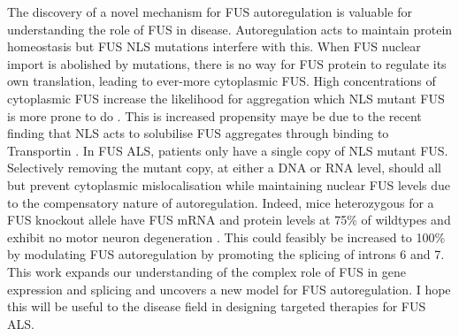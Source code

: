 The discovery of a novel mechanism for FUS autoregulation is valuable for understanding the role of FUS in disease.
Autoregulation acts to maintain protein homeostasis but FUS NLS mutations interfere with this.
When FUS nuclear import is abolished by mutations, there is no way for FUS protein to regulate  its own translation, leading to ever-more cytoplasmic FUS.
High concentrations of cytoplasmic FUS increase the likelihood for aggregation which NLS mutant FUS is more prone to do \citep{Bosco2010}. 
This is increased propensity maye be due to the recent finding that NLS acts to solubilise FUS aggregates through binding to Transportin \citep{Guo2018,Yoshizawa2018,Hofweber2018}.
In FUS ALS, patients only have a single copy of NLS mutant FUS. 
Selectively removing the mutant copy, at either a DNA or RNA level, should all but prevent cytoplasmic mislocalisation while maintaining nuclear FUS levels due to the compensatory nature of autoregulation. 
Indeed, mice heterozygous for a FUS knockout allele have FUS mRNA and protein levels at 75\% of wildtypes and exhibit no motor neuron degeneration \citep{Scekic-Zahirovic2017}. 
This could feasibly be increased to 100\% by modulating FUS autoregulation by promoting the splicing of introns 6 and 7. 
This work expands our understanding of the complex role of FUS in gene expression and splicing and uncovers a new model for FUS autoregulation. 
I hope this will be useful to the disease field in designing targeted therapies for FUS ALS.









